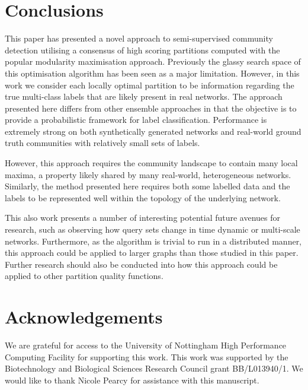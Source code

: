 \documentclass[sigconf]{acmart}
\begin{document}
\section{Conclusions}
This paper has presented a novel approach to semi-supervised community detection utilising a consensus of high scoring partitions computed with the popular modularity maximisation approach.
Previously the glassy search space of this optimisation algorithm has been seen as a major limitation.
However, in this work we consider each locally optimal partition to be information regarding the true multi-class labels that are likely present in real networks.
The approach presented here differs from other ensemble approaches in that the objective is to provide a probabilistic framework for label classification.
Performance is extremely strong on both synthetically generated networks and real-world ground truth communities with relatively small sets of labels.

However, this approach requires the community landscape to contain many local maxima, a property likely shared by many real-world, heterogeneous networks.
Similarly, the method presented here requires both some labelled data and the labels to be represented well within the topology of the underlying network.

This also work presents a number of interesting potential future avenues for research, such as observing how query sets change in time dynamic or multi-scale networks.
Furthermore, as the algorithm is trivial to run in a distributed manner, this approach could be applied to larger graphs than those studied in this paper.
Further research should also be conducted into how this approach could be applied to other partition quality functions.

\section*{Acknowledgements}
We are grateful for access to the University of Nottingham High Performance Computing Facility for supporting this work.
This work was supported by the Biotechnology and Biological Sciences Research Council grant BB/L013940/1.
We would like to thank Nicole Pearcy for assistance with this manuscript.

 


\end{document}
